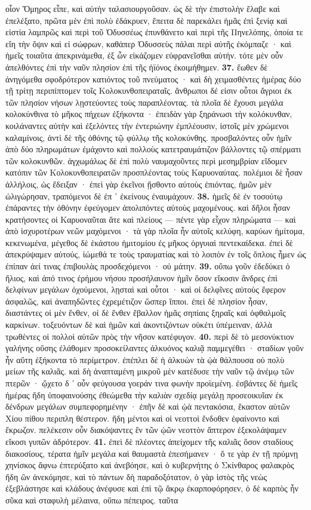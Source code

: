 \documentclass[a4paper, 11pt, oneside, polutonikogreek, german]{article}
\begin{document}
οἷον Ὅμηρος εἶπε, καὶ αὐτὴν ταλασιουργοῦσαν. ὡς δὲ τὴν ἐπιστολὴν ἔλαβε καὶ ἐπελέξατο, πρῶτα μὲν ἐπὶ πολὺ ἐδάκρυεν, ἔπειτα δὲ παρεκάλει ἡμᾶς ἐπὶ ξενίᾳ καὶ εἱστία λαμπρῶς καὶ περὶ τοῦ Ὀδυσσέως ἐπυνθάνετο καὶ περὶ τῆς Πηνελόπης, ὁποία τε εἴη τὴν ὄψιν καὶ εἰ σώφρων, καθάπερ Ὀδυσσεὺς πάλαι περὶ αὐτῆς ἐκόμπαζε · καὶ ἡμεῖς τοιαῦτα ἀπεκρινάμεθα, ἐξ ὧν εἰκάζομεν εὐφρανεῖσθαι αὐτήν. τότε μὲν οὖν ἀπελθόντες ἐπὶ τὴν ναῦν πλησίον ἐπὶ τῆς ἠϊόνος ἐκοιμήθημεν. \textbf{37.} ἕωθεν δὲ ἀνηγόμεθα σφοδρότερον κατιόντος τοῦ πνεύματος · καὶ δὴ χειμασθέντες ἡμέρας δύο τῇ τρίτῃ περιπίπτομεν τοῖς Κολοκυνθοπειραταῖς. ἄνθρωποι δέ εἰσιν οὗτοι ἄγριοι ἐκ τῶν πλησίον νήσων λῃστεύοντες τοὺς παραπλέοντας. τὰ πλοῖα δὲ ἔχουσι μεγάλα κολοκύνθινα τὸ μῆκος πήχεων ἑξήκοντα · ἐπειδὰν γὰρ ξηράνωσι τὴν κολόκυνθαν, κοιλάναντες αὐτὴν καὶ ἐξελόντες τὴν ἐντεριώνην ἐμπλέουσιν, ἱστοῖς μὲν χρώμενοι καλαμίνοις, ἀντὶ δὲ τῆς ὀθόνης τῷ φύλλῳ τῆς κολοκύνθης. προσβαλόντες οὖν ἡμῖν ἀπὸ δύο πληρωμάτων ἐμάχοντο καὶ πολλοὺς κατετραυμάτιζον βάλλοντες τῷ σπέρματι τῶν κολοκυνθῶν. ἀγχωμάλως δὲ ἐπὶ πολὺ ναυμαχοῦντες περὶ μεσημβρίαν εἴδομεν κατόπιν τῶν Κολοκυνθοπειρατῶν προσπλέοντας τοὺς Καρυοναύτας. πολέμιοι δὲ ἦσαν ἀλλήλοις, ὡς ἔδειξαν · ἐπεὶ γὰρ ἐκεῖνοι ᾔσθοντο αὐτοὺς ἐπιόντας, ἡμῶν μὲν ὠλιγώρησαν, τραπόμενοι δὲ ἐπ ᾽ ἐκείνους ἐναυμάχουν. \textbf{38.} ἡμεῖς δὲ ἐν τοσούτῳ ἐπάραντες τὴν ὀθόνην ἐφεύγομεν ἀπολιπόντες αὐτοὺς μαχομένους. καὶ δῆλοι ἦσαν κρατήσοντες οἱ Καρυοναῦται ἅτε καὶ πλείους --- πέντε γὰρ εἶχον πληρώματα --- καὶ ἀπὸ ἰσχυροτέρων νεῶν μαχόμενοι · τὰ γὰρ πλοῖα ἦν αὐτοῖς κελύφη, καρύων ἡμίτομα, κεκενωμένα, μέγεθος δὲ ἑκάστου ἡμιτομίου ἐς μῆκος ὀργυιαὶ πεντεκαίδεκα. ἐπεὶ δὲ ἀπεκρύψαμεν αὐτούς, ἰώμεθά τε τοὺς τραυματίας καὶ τὸ λοιπὸν ἐν τοῖς ὅπλοις ἦμεν ὡς ἐπίπαν ἀεί τινας ἐπιβουλὰς προσδεχόμενοι · οὐ μάτην. \textbf{39.} οὔπω γοῦν ἐδεδύκει ὁ ἥλιος, καὶ ἀπό τινος ἐρήμου νήσου προσήλαυνον ἡμῖν ὅσον εἴκοσιν ἄνδρες ἐπὶ δελφίνων μεγάλων ὀχούμενοι, λῃσταὶ καὶ οὗτοι · καὶ οἱ δελφῖνες αὐτοὺς ἔφερον ἀσφαλῶς, καὶ ἀναπηδῶντες ἐχρεμέτιζον ὥσπερ ἵπποι. ἐπεὶ δὲ πλησίον ἦσαν, διαστάντες οἱ μὲν ἔνθεν, οἱ δὲ ἔνθεν ἔβαλλον ἡμᾶς σηπίαις ξηραῖς καὶ ὀφθαλμοῖς καρκίνων. τοξευόντων δὲ καὶ ἡμῶν καὶ ἀκοντιζόντων οὐκέτι ὑπέμειναν, ἀλλὰ τρωθέντες οἱ πολλοὶ αὐτῶν πρὸς τὴν νῆσον κατέφυγον. \textbf{40.} περὶ δὲ τὸ μεσονύκτιον γαλήνης οὔσης ἐλάθομεν προσοκείλαντες ἀλκυόνος καλιᾷ παμμεγέθει · σταδίων γοῦν ἦν αὕτη ἑξήκοντα τὸ περίμετρον. ἐπέπλει δὲ ἡ ἀλκυὼν τὰ ᾠὰ θάλπουσα οὐ πολὺ μείων τῆς καλιᾶς. καὶ δὴ ἀναπταμένη μικροῦ μὲν κατέδυσε τὴν ναῦν τῷ ἀνέμῳ τῶν πτερῶν · ᾤχετο δ ᾽ οὖν φεύγουσα γοεράν τινα φωνὴν προϊεμένη. ἐσβάντες δὲ ἡμεῖς ἡμέρας ἤδη ὑποφαινούσης ἐθεώμεθα τὴν καλιὰν σχεδίᾳ μεγάλῃ προσεοικυῖαν ἐκ δένδρων μεγάλων συμπεφορημένην · ἐπῆν δὲ καὶ ᾠὰ πεντακόσια, ἕκαστον αὐτῶν Χίου πίθου περιπλη θέστερον. ἤδη μέντοι καὶ οἱ νεοττοὶ ἔνδοθεν ἐφαίνοντο καὶ ἔκρωζον. πελέκεσιν οὖν διακόψαντες ἓν τῶν ᾠῶν νεοττὸν ἄπτερον ἐξεκολάψαμεν εἴκοσι γυπῶν ἁδρότερον. \textbf{41.} ἐπεὶ δὲ πλέοντες ἀπείχομεν τῆς καλιᾶς ὅσον σταδίους διακοσίους, τέρατα ἡμῖν μεγάλα καὶ θαυμαστὰ ἐπεσήμανεν · ὅ τε γὰρ ἐν τῇ πρύμνῃ χηνίσκος ἄφνω ἐπτερύξατο καὶ ἀνεβόησε, καὶ ὁ κυβερνήτης ὁ Σκίνθαρος φαλακρὸς ἤδη ὢν ἀνεκόμησε, καὶ τὸ πάντων δὴ παραδοξότατον, ὁ γὰρ ἱστὸς τῆς νεὼς ἐξεβλάστησε καὶ κλάδους ἀνέφυσε καὶ ἐπὶ τῷ ἄκρῳ ἐκαρποφόρησεν, ὁ δὲ καρπὸς ἦν σῦκα καὶ σταφυλὴ μέλαινα, οὔπω πέπειρος. ταῦτα 
\end{document}
